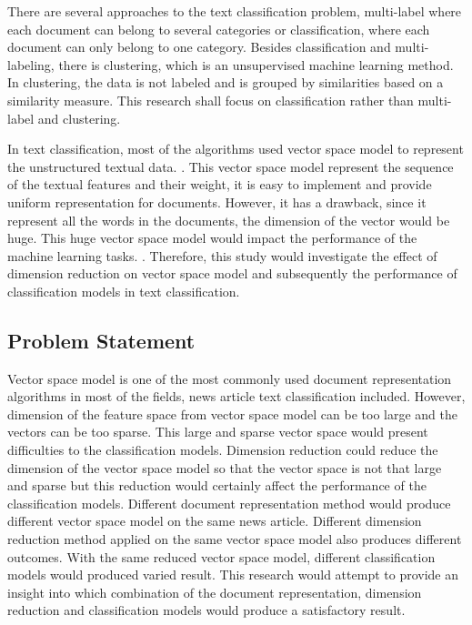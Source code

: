 There are several approaches to the text classification problem, multi-label where each document can belong to several categories or classification, where each document can only belong to one category. Besides classification and multi-labeling, there is clustering, which is an unsupervised machine learning method. In clustering, the data is not labeled and is grouped by similarities based on a similarity measure. This research shall focus on classification rather than multi-label and clustering.

In text classification, most of the algorithms used vector space model to represent the unstructured textual data. \cite{vectorSpaceModelText}. This vector space model represent the sequence of the textual features and their weight, it is easy to implement and provide uniform representation for documents. However, it has a drawback, since it represent all the words in the documents, the dimension of the vector would be huge. This huge vector space model would impact the performance of the machine learning tasks. \cite{knnVectorSpaceReduction}. Therefore, this study would investigate the effect of dimension reduction on vector space model and subsequently the performance of classification models in text classification.\\


\subsection{Problem Statement}
Vector space model is one of the most commonly used document representation algorithms in most of the fields, news article text classification included. However, dimension of the feature space from vector space model can be too large and the vectors can be too sparse. This large and sparse vector space would present difficulties to the classification models. Dimension reduction could reduce the dimension of the vector space model so that the vector space is not that large and sparse but this reduction would certainly affect the performance of the classification models. Different document representation method would produce different vector space model on the same news article. Different dimension reduction method applied on the same vector space model also produces different outcomes. With the same reduced vector space model, different classification models would produced varied result. This research would attempt to provide an insight into which combination of the document representation, dimension reduction and classification models would produce a satisfactory result.\\

